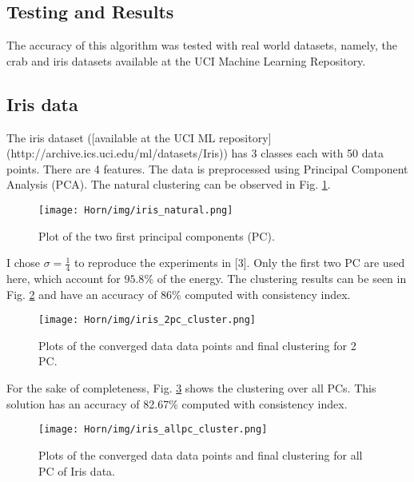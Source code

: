 \subsection{Testing and Results}




The accuracy of this algorithm was tested with real world datasets, namely, the crab and iris datasets available at the UCI Machine Learning Repository.


\subsection{Iris data}
\label{sec:horn_iris}
The iris dataset ([available at the UCI ML repository](http://archive.ics.uci.edu/ml/datasets/Iris)) has 3 classes each with 50 data points. There are 4 features. The data is preprocessed using Principal Component Analysis (PCA). The natural clustering can be observed in Fig. \ref{fig:iris_natural}. 


\begin{figure}[hbtp]
\centering
\texttt{[image: Horn/img/iris\_natural.png]}
\caption{Plot of the two first principal components (PC).}
\label{fig:iris_natural}

\end{figure}

I chose $\sigma=\frac{1}{4}$ to reproduce the experiments in [3]. Only the first two PC are used here, which account for $95.8\%$ of the energy. The clustering results can be seen in Fig. \ref{fig:iris_2pc_cluster} and have an accuracy of 86\% computed with consistency index.


\begin{figure}[hbtp]
\centering
\texttt{[image: Horn/img/iris\_2pc\_cluster.png]}
\caption{Plots of the converged data data points and final clustering for 2 PC.}
\label{fig:iris_2pc_cluster}

\end{figure}

For the sake of completeness, Fig. \ref{fig:iris_allpc_cluster} shows the clustering over all PCs. This solution has an accuracy of 82.67\% computed with consistency index.


\begin{figure}[hbtp]
\centering
\texttt{[image: Horn/img/iris\_allpc\_cluster.png]}
\caption{Plots of the converged data data points and final clustering for all PC of Iris data.}
\label{fig:iris_allpc_cluster}
\end{figure}


